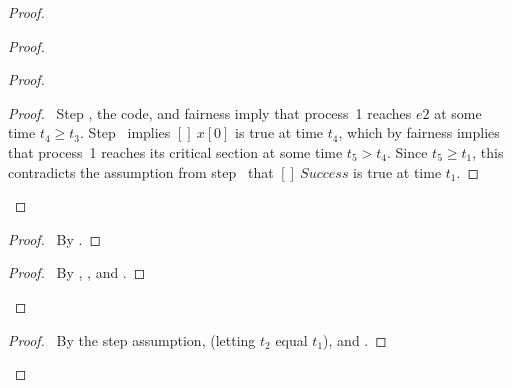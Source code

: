 \documentclass[fleqn,leqno]{article}
\begin{document}
\begin{proof}
\begin{proof}
\begin{proof}
   \qedstep
     \begin{proof}
      \pf\ Step , the code, and fairness imply that process~1 
      reaches $e2$ at some time $t_{4}\geq t_{3}$.   Step~
      implies $[]~x[0]$ is true at time $t_{4}$,
      which by fairness implies that process~1 reaches its critical section at
      some time $t_{5}>t_{4}$.  Since $t_{5}\geq t_{1}$, this contradicts
      the assumption from step~ that $[]~Success$ is true 
      at time $t_{1}$.
     \end{proof}

\end{proof}

  \begin{proof}
  \pf\ By .
  \end{proof}
\qedstep
  \begin{proof}
  \pf\ By , , and .
  \end{proof}  
\end{proof}
\qedstep
\begin{proof}
\pf\ By the step  assumption,  (letting
$t_{2}$ equal $t_{1}$), and .

\end{proof}
\end{proof}
\end{document}
